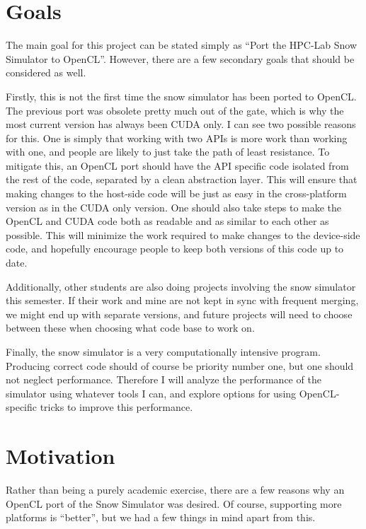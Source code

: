 \section{Goals}
The main goal for this project can be stated simply as “Port the HPC-Lab Snow Simulator to OpenCL”. However, there are a few secondary goals that should be considered as well.

Firstly, this is not the first time the snow simulator has been ported to OpenCL. The previous port was obsolete pretty much out of the gate, which is why the most current version has always been CUDA only. I can see two possible reasons for this. One is simply that working with two APIs is more work than working with one, and people are likely to just take the path of least resistance. To mitigate this, an OpenCL port should have the API specific code isolated from the rest of the code, separated by a clean abstraction layer. This will ensure that making changes to the host-side code will be just as easy in the cross-platform version as in the CUDA only version. One should also take steps to make the OpenCL and CUDA code both as readable and as similar to each other as possible. This will minimize the work required to make changes to the device-side code, and hopefully encourage people to keep both versions of this code up to date.

Additionally, other students are also doing projects involving the snow simulator this semester. If their work and mine are not kept in sync with frequent merging, we might end up with separate versions, and future projects will need to choose between these when choosing what code base to work on.

Finally, the snow simulator is a very computationally intensive program. Producing correct code should of course be priority number one, but one should not neglect performance. Therefore I will analyze the performance of the simulator using whatever tools I can, and explore options for using OpenCL-specific tricks to improve this performance.

\section{Motivation}
Rather than being a purely academic exercise, there are a few reasons why an OpenCL port of the Snow Simulator was desired. Of course, supporting more platforms is ``better'', but we had a few things in mind apart from this.

